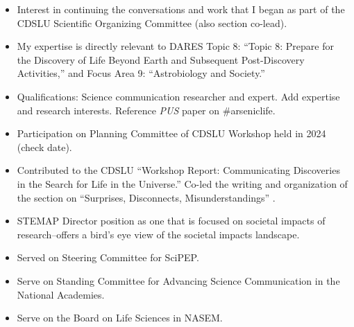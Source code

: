 \documentclass[12pt]{article}
\begin{document}
\begin{itemize}
    \item Interest in continuing the conversations and work that I began as part of the CDSLU Scientific Organizing Committee (also section co-lead).\item My expertise is directly relevant to DARES Topic 8: “Topic 8: Prepare for the Discovery of Life Beyond Earth and Subsequent Post-Discovery Activities,” and Focus Area 9: “Astrobiology and Society.”
    \item Qualifications: Science communication researcher and expert. Add expertise and research interests. Reference \textit{PUS} paper on \#arseniclife.

    \item Participation on Planning Committee of CDSLU Workshop held in 2024 (check date).
    \item Contributed to the CDSLU ``Workshop Report: Communicating Discoveries in the Search for Life in the Universe.'' Co-led the writing and organization of the section on ``Surprises, Disconnects, Misunderstandings'' \parencite{bimmWorkshopReportCommunicatingforthcoming}.
    \item STEMAP Director position as one that is focused on societal impacts of research--offers a bird's eye view of the societal impacts landscape.
    \item Served on Steering Committee for SciPEP.
    \item Serve on Standing Committee for Advancing Science Communication in the National Academies.
    \item Serve on the Board on Life Sciences in NASEM.
\end{itemize}

\newpage

\printbibliography
\end{document}
